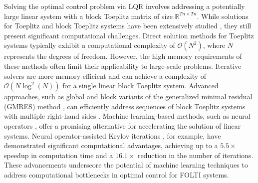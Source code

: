 Solving the optimal control problem via LQR involves addressing a potentially large linear system with a block Toeplitz matrix of size $\mathbb{R}^{Tn \times Tn}$. While solutions for Toeplitz and block Toeplitz systems have been extensively studied \cite{trench1986solution, kalouptsidis1984fast, chandrasekaran1998fast}, they still present significant computational challenges. Direct solution methods for Toeplitz systems typically exhibit a computational complexity of $\mathcal{O}(N^2)$, where $N$ represents the degrees of freedom. However, the high memory requirements of these methods often limit their applicability to large-scale problems. Iterative solvers \cite{chan2007introduction, strang1986proposal} are more memory-efficient and can achieve a complexity of $\mathcal{O}(N \log^2(N))$ for a single linear block Toeplitz system. Advanced approaches, such as global and block variants of the generalized minimal residual (GMRES) method \cite{saad1986gmres}, can efficiently address sequences of block Toeplitz systems with multiple right-hand sides \cite{jelich2021efficient}. Machine learning-based methods, such as neural operators \cite{li2021fourierneuraloperatorparametric, gupta2021multiwavelet, gupta2022non, xiao2022coupled}, offer a promising alternative for accelerating the solution of linear systems. Neural operator-assisted Krylov iterations \cite{luo2024neural}, for example, have demonstrated significant computational advantages, achieving up to a $5.5\times$ speedup in computation time and a $16.1\times$ reduction in the number of iterations. These advancements underscore the potential of machine learning techniques to address computational bottlenecks in optimal control for FOLTI systems.